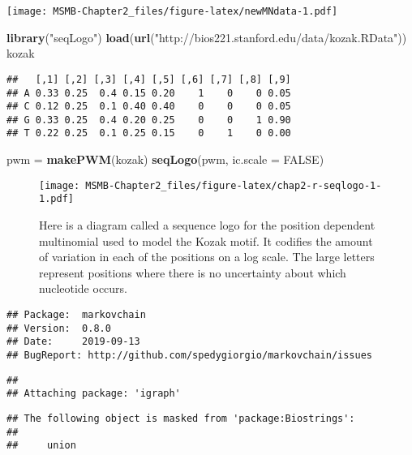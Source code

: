 \documentclass[]{article}
\newenvironment{Shaded}{\begin{snugshade}}{\end{snugshade}}
\newcommand{\KeywordTok}[1]{\textcolor[rgb]{0.13,0.29,0.53}{\textbf{#1}}}
\newcommand{\DataTypeTok}[1]{\textcolor[rgb]{0.13,0.29,0.53}{#1}}
\newcommand{\StringTok}[1]{\textcolor[rgb]{0.31,0.60,0.02}{#1}}
\newcommand{\OtherTok}[1]{\textcolor[rgb]{0.56,0.35,0.01}{#1}}
\newcommand{\NormalTok}[1]{#1}
\begin{document}
\texttt{[image: MSMB-Chapter2\_files/figure-latex/newMNdata-1.pdf]}

\begin{Shaded}
\begin{Highlighting}[]
\KeywordTok{library}\NormalTok{(}\StringTok{"seqLogo"}\NormalTok{)}
\KeywordTok{load}\NormalTok{(}\KeywordTok{url}\NormalTok{(}\StringTok{"http://bios221.stanford.edu/data/kozak.RData"}\NormalTok{))}
\NormalTok{kozak}
\end{Highlighting}
\end{Shaded}

\begin{verbatim}
##   [,1] [,2] [,3] [,4] [,5] [,6] [,7] [,8] [,9]
## A 0.33 0.25  0.4 0.15 0.20    1    0    0 0.05
## C 0.12 0.25  0.1 0.40 0.40    0    0    0 0.05
## G 0.33 0.25  0.4 0.20 0.25    0    0    1 0.90
## T 0.22 0.25  0.1 0.25 0.15    0    1    0 0.00
\end{verbatim}

\begin{Shaded}
\begin{Highlighting}[]
\NormalTok{pwm =}\StringTok{ }\KeywordTok{makePWM}\NormalTok{(kozak)}
\KeywordTok{seqLogo}\NormalTok{(pwm, }\DataTypeTok{ic.scale =} \OtherTok{FALSE}\NormalTok{)}
\end{Highlighting}
\end{Shaded}

\begin{figure}
\centering
\texttt{[image: MSMB-Chapter2\_files/figure-latex/chap2-r-seqlogo-1-1.pdf]}
\caption{Here is a diagram called a sequence logo for the position
dependent multinomial used to model the Kozak motif. It codifies the
amount of variation in each of the positions on a log scale. The large
letters represent positions where there is no uncertainty about which
nucleotide occurs.}
\end{figure}

\begin{verbatim}
## Package:  markovchain
## Version:  0.8.0
## Date:     2019-09-13
## BugReport: http://github.com/spedygiorgio/markovchain/issues
\end{verbatim}

\begin{verbatim}
## 
## Attaching package: 'igraph'
\end{verbatim}

\begin{verbatim}
## The following object is masked from 'package:Biostrings':
## 
##     union
\end{verbatim}
\end{document}
